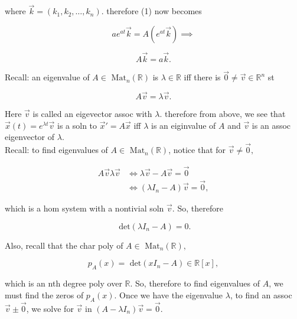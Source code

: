 \documentclass[12pt,a4paper]{article}
\theoremstyle{definition}
\begin{document}
where \( \vec{k} = (k_1, k_2, \dots , k_n) \). therefore (1) now becomes

\[ ae^{at}\vec{k} = A(e^{at}\vec{k}) \implies  \]

\[ A\vec{k} = a\vec{k}. \]

Recall: an eigenvalue of \( A \in \text{ Mat}_n( \mathbb{R}) \) is
\( \lambda \in \mathbb{R} \) iff there is \( \vec{0} \neq \vec{v} \in
\mathbb{R}^n\) st 

\[ A\vec{v} = \lambda \vec{v}. \]

Here \( \vec{v} \) is called an eigevector assoc with \( \lambda. \)
therefore from above, we see that \( \vec{x}(t) = e^{\lambda t}\vec{v}
\) is a soln to \( \vec{x}' = A \vec{x} \) iff \( \lambda \) is an
eiginvalue of \( A \) and \( \vec{v} \) is an assoc eigenvector of \(
\lambda. \) \\

Recall: to find eigenvalues of \( A \in \text{ Mat}_n( \mathbb{R}) \),
notice that for \( \vec{v} \neq \vec{0}, \)

\begin{align*}
  A\vec{v} \lambda \vec{v} &\iff \lambda \vec{v} - A \vec{v} = \vec{0}\\
  &\iff (\lambda I_n  - A) \vec{v} = \vec{0}, 
\end{align*}

which is a hom system with a nontivial soln \( \vec{v} \). So, therefore

\[ \text{ det}(\lambda I_n -A) = 0.\]

Also, recall that the char poly of \(  A \in \text{ Mat}_n( \mathbb{R}),  \)

\[ p_A(x) = \text{ det}(xI_n-A) \in \mathbb{R}[x], \]

which is an nth degree poly over \( \mathbb{R} \). So, therefore to find
eigenvalues of \( A \), we must find the zeros of \( p_A(x) \). Once we
have the eigenvalue \( \lambda \), to find an assoc \( \vec{v} \pm
\vec{0} \), we solve for \( \vec{v} \) in \( (A - \lambda I_n) \vec{v} =
 \vec{0}\). 
\end{document}
